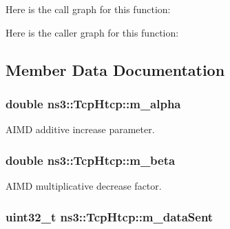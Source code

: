 Here is the call graph for this function\+:




Here is the caller graph for this function\+:




\subsection{Member Data Documentation}
\subsubsection[{\texorpdfstring{m\+\_\+alpha}{m_alpha}}]{\setlength{\rightskip}{0pt plus 5cm}double ns3\+::\+Tcp\+Htcp\+::m\+\_\+alpha\hspace{0.3cm}{\ttfamily [private]}}\hypertarget{classns3_1_1TcpHtcp_a5cc68a58825c8ed19b2666da91e7e4d0}{}\label{classns3_1_1TcpHtcp_a5cc68a58825c8ed19b2666da91e7e4d0}


A\+I\+MD additive increase parameter. 

\subsubsection[{\texorpdfstring{m\+\_\+beta}{m_beta}}]{\setlength{\rightskip}{0pt plus 5cm}double ns3\+::\+Tcp\+Htcp\+::m\+\_\+beta\hspace{0.3cm}{\ttfamily [private]}}\hypertarget{classns3_1_1TcpHtcp_a76d41b0e13e42f6aa9b98a4a0cb06400}{}\label{classns3_1_1TcpHtcp_a76d41b0e13e42f6aa9b98a4a0cb06400}


A\+I\+MD multiplicative decrease factor. 

\subsubsection[{\texorpdfstring{m\+\_\+data\+Sent}{m_dataSent}}]{\setlength{\rightskip}{0pt plus 5cm}uint32\+\_\+t ns3\+::\+Tcp\+Htcp\+::m\+\_\+data\+Sent\hspace{0.3cm}{\ttfamily [private]}}\hypertarget{classns3_1_1TcpHtcp_a263e88a7986de6a76ff85ac7d6d25ab5}{}\label{classns3_1_1TcpHtcp_a263e88a7986de6a76ff85ac7d6d25ab5}


